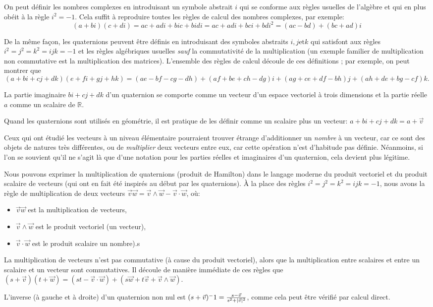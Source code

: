 On peut définir les nombres complexes en introduisant un symbole abstrait $i$ qui se conforme aux 
règles usuelles de l'algèbre et qui en plus obéit à la règle $i^2 = - 1$. 
Cela suffit à reproduire toutes les règles de calcul des nombres complexes, 
par exemple: 
\[
(a + bi)(c + di) = ac + adi + bic + bidi = ac + adi + bci + bdi^{2} = (ac - bd) + (bc + ad) i
\]

De la même façon, les quaternions peuvent être définis en introduisant des symboles abstraits $i, j \text{et} k$ qui satisfont aux règles $i^2 = j^2 = k^2 = ijk = -1$ et les règles algébriques usuelles \emph{sauf} la commutativité de la multiplication (un exemple familier de multiplication non commutative est la multiplication des matrices). L'ensemble des règles de calcul découle de ces définitions ; par exemple, on peut montrer que 
\[
(a+bi+cj+dk)(e+fi+gj+hk)=(ae-bf-cg-dh)+(af+be+ch-dg)i+(ag+ce+df-bh)j+(ah+de+bg-cf)k.
\]

La partie imaginaire $bi+cj+dk$ d'un quaternion se comporte comme un vecteur  d'un espace vectoriel à trois dimensions et la partie réelle $a$ comme un scalaire de $\mathbb{R}$.

Quand les quaternions sont utilisés en géométrie, il est pratique de les définir comme un scalaire plus un vecteur: $a+bi+cj+dk = a + \vec{v}$

Ceux qui ont étudié les vecteurs à un niveau élémentaire pourraient trouver étrange d'additionner un \emph{nombre} à un vecteur, car ce sont des objets de natures très différentes, ou de \emph{multiplier} deux vecteurs entre eux, car cette opération n'est d'habitude pas définie. Néanmoins, si l'on se souvient qu'il ne s'agit là que d'une notation pour les parties réelles et imaginaires d'un quaternion, cela devient plus légitime.

Nous pouvons exprimer la multiplication de quaternions (produit de Hamilton) dans le langage moderne du produit vectoriel et du produit scalaire de vecteurs (qui ont en fait été inspirés au début par les quaternions). À la place des règles $i^2=j^2=k^2=ijk=-1$, nous avons la règle de multiplication de deux vecteurs $\vec{v}\vec{w}=\vec{v}\wedge\vec{w}-\vec{v}\cdot\vec{w}$, où:

\begin{itemize}
	\item $\vec{v}\vec{w}$ est la multiplication de vecteurs,
	\item $\vec{v}\wedge\vec{w}$ est le produit vectoriel (un vecteur),
	\item $\vec{v}\cdot\vec{w}$ est le produit scalaire un nombre).s
\end{itemize}

La multiplication de vecteurs n'est pas commutative (à cause du produit vectoriel), alors que la multiplication entre scalaires et entre un scalaire et un vecteur sont commutatives. Il découle de manière immédiate de ces règles que $(s + \vec{v})(t + \vec{w}) = (st - \vec{v}\cdot\vec{w}) + (s\vec{w}+t\vec{v}+\vec{v}\wedge\vec{w})$.

L'inverse (à gauche et à droite) d'un quaternion non nul est $(s + \vec{v})^-1 = 
\frac{s - \vec{v}}{s^2 + \lvert\vec{v}\rvert^2}$, comme cela peut être vérifié par calcul direct.